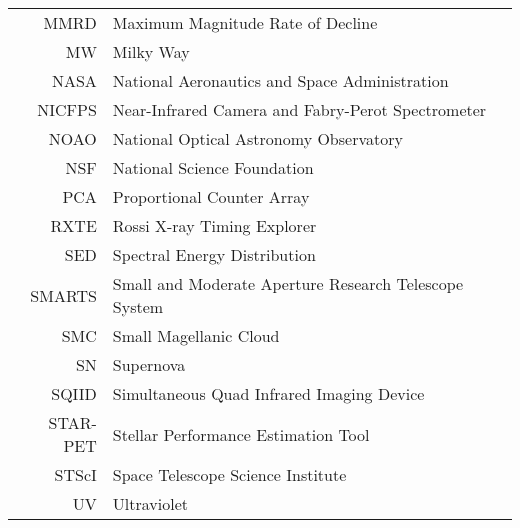 \begin{tabular}{rl}
MMRD      &     Maximum Magnitude Rate of Decline\\
MW        &     Milky Way\\
NASA      &     National Aeronautics and Space Administration\\
NICFPS    &     Near-Infrared Camera and Fabry-Perot Spectrometer\\
NOAO      &     National Optical Astronomy Observatory\\
NSF       &     National Science Foundation\\
PCA       &     Proportional Counter Array\\
RXTE      &     Rossi X-ray Timing Explorer\\
SED       &     Spectral Energy Distribution\\
SMARTS    &     Small and Moderate Aperture Research Telescope System\\
SMC       &     Small Magellanic Cloud\\
SN        &     Supernova\\
SQIID     &     Simultaneous Quad Infrared Imaging Device\\
STAR-PET  &     Stellar Performance Estimation Tool\\
STScI     &     Space Telescope Science Institute\\
UV        &     Ultraviolet\\
\end{tabular}
